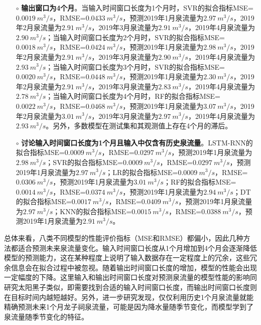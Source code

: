 \begin{enumerate}
\begin{itemize}
    \item[$\circ$] \textbf{输出窗口为4个月}。当输入时间窗口长度为1个月时，SVR的拟合指标MSE=$\SI{0.0019}{m^{3}/s}$，RMSE=$\SI{0.0433}{m^{3}/s}$，预测2019年1月泉流量为$\SI{2.97}{m^{3}/s}$，2019年2月泉流量为$\SI{2.91}{m^{3}/s}$，2019年3月泉流量为$\SI{2.91}{m^{3}/s}$，2019年4月泉流量为$\SI{2.90}{m^{3}/s}$；当输入时间窗口长度为2个月时，SVR的拟合指标MSE=$\SI{0.0018}{m^{3}/s}$，RMSE=$\SI{0.0424}{m^{3}/s}$，预测2019年1月泉流量为$\SI{2.98}{m^{3}/s}$，2019年2月泉流量为$\SI{2.91}{m^{3}/s}$，2019年3月泉流量为$\SI{2.90}{m^{3}/s}$，2019年4月泉流量为$\SI{2.93}{m^{3}/s}$；当输入时间窗口长度为3个月时，SVR的拟合指标MSE=$\SI{0.0020}{m^{3}/s}$，RMSE=$\SI{0.0448}{m^{3}/s}$，预测2019年1月泉流量为$\SI{2.30}{m^{3}/s}$，2019年2月泉流量为$\SI{2.91}{m^{3}/s}$，2019年3月泉流量为$\SI{2.83}{m^{3}/s}$，2019年4月泉流量为$\SI{2.78}{m^{3}/s}$；当输入时间窗口长度为4个月时，RF的拟合指标MSE=$\SI{0.0022}{m^{3}/s}$，RMSE=$\SI{0.0468}{m^{3}/s}$，预测2019年1月泉流量为$\SI{3.07}{m^{3}/s}$，2019年2月泉流量为$\SI{3.01}{m^{3}/s}$，2019年3月泉流量为$\SI{2.97}{m^{3}/s}$，2019年4月泉流量为$\SI{2.93}{m^{3}/s}$。另外，多数模型在测试集和其观测值上存在4个月的滞后。
    \item[$\circ$] \textbf{讨论输入时间窗口长度为1个月且输入中仅含有历史泉流量}。LSTM-RNN的拟合指标MSE=$\SI{0.0009}{m^{3}/s}$，RMSE=$\SI{0.0297}{m^{3}/s}$，预测2019年1月泉流量为$\SI{2.98}{m^{3}/s}$；SVR的拟合指标MSE=$\SI{0.0009}{m^{3}/s}$，RMSE=$\SI{0.0297}{m^{3}/s}$，预测2019年1月泉流量为$\SI{2.97}{m^{3}/s}$；LR的拟合指标MSE=$\SI{0.0009}{m^{3}/s}$，RMSE=$\SI{0.0306}{m^{3}/s}$，预测2019年1月泉流量为$\SI{3.01}{m^{3}/s}$；RF的拟合指标MSE=$\SI{0.0014}{m^{3}/s}$，RMSE=$\SI{0.0374}{m^{3}/s}$，预测2019年1月泉流量为$\SI{2.94}{m^{3}/s}$；DT的拟合指标MSE=$\SI{0.0017}{m^{3}/s}$，RMSE=$\SI{0.0409}{m^{3}/s}$，预测2019年1月泉流量为$\SI{2.97}{m^{3}/s}$；KNN的拟合指标MSE=$\SI{0.0015}{m^{3}/s}$，RMSE=$\SI{0.0388}{m^{3}/s}$，预测2019年1月泉流量为$\SI{2.91}{m^{3}/s}$。 
  \end{itemize}
    
  总体来看，八类不同模型的性能评价指标（MSE和RMSE）都偏小，因此几种方法都适合预测未来泉流量变化。输入时间窗口长度从1个月增加到4个月会逐渐降低模型的预测能力，这在某种程度上说明了输入数据存在一定程度上的冗余，这些冗余信息会在拟合过程中被忽视。随着输出时间窗口长度的增加，模型的性能会出现一定幅度的下降。这里输入和输出时间窗口长度对预测泉流量的模型性能的影响同研究太阳黑子类似，即需要找到合适的输入时间窗口长度，而输出时间窗口长度则在目标时间内越短越好。另外，进一步研究发现，仅仅利用历史1个月泉流量就能精确预测未来1个月龙子祠泉流量，可能是因为降水量随季节变化，而模型学到了泉流量随季节变化的特征。


\end{enumerate}
